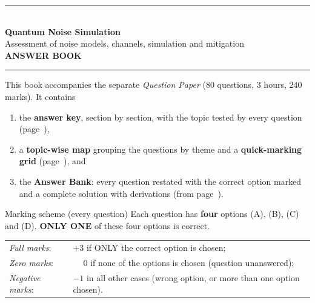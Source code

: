 \documentclass[11pt,a4paper]{article}
\begin{document}
\pagestyle{fancy}\fancyhf{}
\renewcommand{\headrulewidth}{0.4pt}

\thispagestyle{empty}
\begin{center}
{\color{brand}\rule{\linewidth}{1.2pt}}\\[6pt]
{\Huge\bfseries\color{brand} Quantum Noise Simulation}\\[4pt]
{\Large Assessment of noise models, channels, simulation and mitigation}\\[4pt]
{\large\bfseries ANSWER BOOK}\\[2pt]
{\color{brand}\rule{\linewidth}{1.2pt}}
\end{center}
This book accompanies the separate \emph{Question Paper} (80 questions, 3 hours, 240 marks). It contains
\begin{enumerate}[leftmargin=1.4em, itemsep=0pt, topsep=2pt]
\item the \textbf{answer key}, section by section, with the topic tested by every question (page~\pageref{key}),
\item a \textbf{topic-wise map} grouping the questions by theme and a \textbf{quick-marking grid} (page~\pageref{topicmap}), and
\item the \textbf{Answer Bank}: every question restated with the correct option marked \textcolor{okgreen}{} and a
      complete solution with derivations (from page~\pageref{bank}).
\end{enumerate}
\begin{infobox}{Marking scheme (every question)}
Each question has \textbf{four} options (A), (B), (C) and (D). \textbf{ONLY ONE} of these four options is correct.\\[2pt]
\begin{tabular}{@{}ll@{}}
\emph{Full marks}: & $+3$ if ONLY the correct option is chosen;\\
\emph{Zero marks}: & $\phantom{+}0$ if none of the options is chosen (question unanswered);\\
\emph{Negative marks}: & $-1$ in all other cases (wrong option, or more than one option chosen).
\end{tabular}
\end{infobox}
\end{document}
